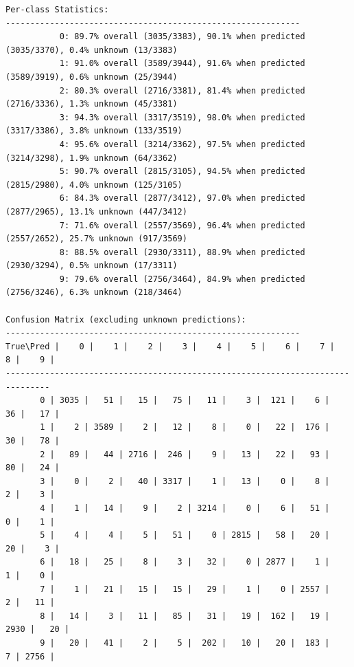 \begin{verbatim}
Per-class Statistics:
------------------------------------------------------------
           0: 89.7% overall (3035/3383), 90.1% when predicted (3035/3370), 0.4% unknown (13/3383)
           1: 91.0% overall (3589/3944), 91.6% when predicted (3589/3919), 0.6% unknown (25/3944)
           2: 80.3% overall (2716/3381), 81.4% when predicted (2716/3336), 1.3% unknown (45/3381)
           3: 94.3% overall (3317/3519), 98.0% when predicted (3317/3386), 3.8% unknown (133/3519)
           4: 95.6% overall (3214/3362), 97.5% when predicted (3214/3298), 1.9% unknown (64/3362)
           5: 90.7% overall (2815/3105), 94.5% when predicted (2815/2980), 4.0% unknown (125/3105)
           6: 84.3% overall (2877/3412), 97.0% when predicted (2877/2965), 13.1% unknown (447/3412)
           7: 71.6% overall (2557/3569), 96.4% when predicted (2557/2652), 25.7% unknown (917/3569)
           8: 88.5% overall (2930/3311), 88.9% when predicted (2930/3294), 0.5% unknown (17/3311)
           9: 79.6% overall (2756/3464), 84.9% when predicted (2756/3246), 6.3% unknown (218/3464)

Confusion Matrix (excluding unknown predictions):
------------------------------------------------------------
True\Pred |    0 |    1 |    2 |    3 |    4 |    5 |    6 |    7 |    8 |    9 |
-------------------------------------------------------------------------------
       0 | 3035 |   51 |   15 |   75 |   11 |    3 |  121 |    6 |   36 |   17 |
       1 |    2 | 3589 |    2 |   12 |    8 |    0 |   22 |  176 |   30 |   78 |
       2 |   89 |   44 | 2716 |  246 |    9 |   13 |   22 |   93 |   80 |   24 |
       3 |    0 |    2 |   40 | 3317 |    1 |   13 |    0 |    8 |    2 |    3 |
       4 |    1 |   14 |    9 |    2 | 3214 |    0 |    6 |   51 |    0 |    1 |
       5 |    4 |    4 |    5 |   51 |    0 | 2815 |   58 |   20 |   20 |    3 |
       6 |   18 |   25 |    8 |    3 |   32 |    0 | 2877 |    1 |    1 |    0 |
       7 |    1 |   21 |   15 |   15 |   29 |    1 |    0 | 2557 |    2 |   11 |
       8 |   14 |    3 |   11 |   85 |   31 |   19 |  162 |   19 | 2930 |   20 |
       9 |   20 |   41 |    2 |    5 |  202 |   10 |   20 |  183 |    7 | 2756 |




\end{verbatim}

